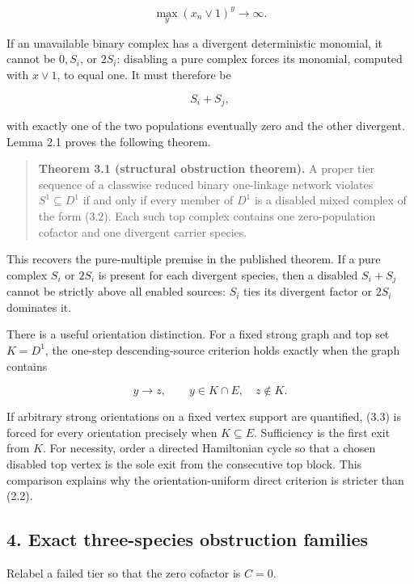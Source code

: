 \[
                  \max_y (x_n\vee1)^y\longrightarrow\infty .  \tag{3.1}
\]

If an unavailable binary complex has a divergent deterministic monomial,
it cannot be \(0,S_i\), or \(2S_i\): disabling a pure complex forces its
monomial, computed with \(x\vee1\), to equal one. It must therefore be

\[
                            S_i+S_j,                             \tag{3.2}
\]

with exactly one of the two populations eventually zero and the other
divergent. Lemma 2.1 proves the following theorem.

\begin{quote}
\textbf{Theorem 3.1 (structural obstruction theorem).} A proper tier
sequence of a classwise reduced binary one-linkage network violates
\(S^1\subseteq D^1\) if and only if every member of \(D^1\) is a
disabled mixed complex of the form (3.2). Each such top complex contains
one zero-population cofactor and one divergent carrier species.
\end{quote}

This recovers the pure-multiple premise in the published theorem. If a
pure complex \(S_i\) or \(2S_i\) is present for each divergent species,
then a disabled \(S_i+S_j\) cannot be strictly above all enabled
sources: \(S_i\) ties its divergent factor or \(2S_i\) dominates it.

There is a useful orientation distinction. For a fixed strong graph and
top set \(K=D^1\), the one-step descending-source criterion holds
exactly when the graph contains

\[
                    y\longrightarrow z,\qquad
                 y\in K\cap E,\quad z\notin K.                 \tag{3.3}
\]

If arbitrary strong orientations on a fixed vertex support are
quantified, (3.3) is forced for every orientation precisely when
\(K\subseteq E\). Sufficiency is the first exit from \(K\). For
necessity, order a directed Hamiltonian cycle so that a chosen disabled
top vertex is the sole exit from the consecutive top block. This
comparison explains why the orientation-uniform direct criterion is
stricter than (2.2).

\subsection{4. Exact three-species obstruction
families}

Relabel a failed tier so that the zero cofactor is \(C=0\).

